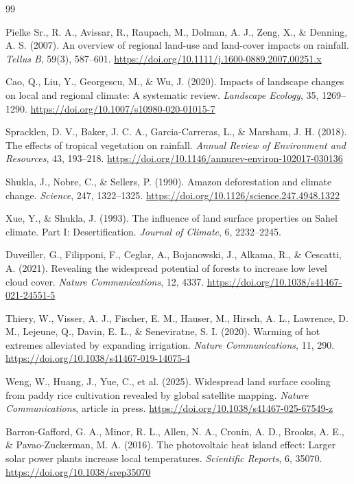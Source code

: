 \documentclass[10pt,twocolumn]{article}
\begin{document}
\begin{thebibliography}{99}
\setlength{\itemsep}{0pt}

Pielke Sr., R. A., Avissar, R., Raupach, M., Dolman, A. J., Zeng, X., \& Denning, A. S. (2007). An overview of regional land-use and land-cover impacts on rainfall. \textit{Tellus B}, 59(3), 587--601. \url{https://doi.org/10.1111/j.1600-0889.2007.00251.x}

Cao, Q., Liu, Y., Georgescu, M., \& Wu, J. (2020). Impacts of landscape changes on local and regional climate: A systematic review. \textit{Landscape Ecology}, 35, 1269--1290. \url{https://doi.org/10.1007/s10980-020-01015-7}

Spracklen, D. V., Baker, J. C. A., Garcia-Carreras, L., \& Marsham, J. H. (2018). The effects of tropical vegetation on rainfall. \textit{Annual Review of Environment and Resources}, 43, 193--218. \url{https://doi.org/10.1146/annurev-environ-102017-030136}

Shukla, J., Nobre, C., \& Sellers, P. (1990). Amazon deforestation and climate change. \textit{Science}, 247, 1322--1325. \url{https://doi.org/10.1126/science.247.4948.1322}

Xue, Y., \& Shukla, J. (1993). The influence of land surface properties on Sahel climate. Part I: Desertification. \textit{Journal of Climate}, 6, 2232--2245.

Duveiller, G., Filipponi, F., Ceglar, A., Bojanowski, J., Alkama, R., \& Cescatti, A. (2021). Revealing the widespread potential of forests to increase low level cloud cover. \textit{Nature Communications}, 12, 4337. \url{https://doi.org/10.1038/s41467-021-24551-5}

Thiery, W., Visser, A. J., Fischer, E. M., Hauser, M., Hirsch, A. L., Lawrence, D. M., Lejeune, Q., Davin, E. L., \& Seneviratne, S. I. (2020). Warming of hot extremes alleviated by expanding irrigation. \textit{Nature Communications}, 11, 290. \url{https://doi.org/10.1038/s41467-019-14075-4}

Weng, W., Huang, J., Yue, C., et al. (2025). Widespread land surface cooling from paddy rice cultivation revealed by global satellite mapping. \textit{Nature Communications}, article in press. \url{https://doi.org/10.1038/s41467-025-67549-z}

Barron-Gafford, G. A., Minor, R. L., Allen, N. A., Cronin, A. D., Brooks, A. E., \& Pavao-Zuckerman, M. A. (2016). The photovoltaic heat island effect: Larger solar power plants increase local temperatures. \textit{Scientific Reports}, 6, 35070. \url{https://doi.org/10.1038/srep35070}


\end{thebibliography}
\end{document}
